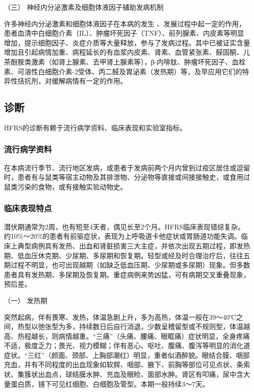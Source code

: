 \hypertarget{text00223.htmlux5cux23CHP7-7-1-2-3}{}
（三） 神经内分泌激素及细胞体液因子辅助发病机制

许多神经内分泌激素和细胞体液因子在本病的发生
、发展过程中起一定的作用，患者血清中白细胞介素（IL）、肿瘤坏死因子（TNF）、前列腺素、内皮素等明显增加，提示细胞因子、炎症介质等大量释放，参与了发病过程。其中已被证实含量增加且引起病情加重、病程延长的有血浆内皮素、肾素、血管紧张素、醛固酮、儿茶酚胺类激素（如肾上腺素、去甲肾上腺素等），β-内啡肽、肿瘤坏死因子、血栓素、可溶性白细胞介素-2受体、丙二醛及胃泌素（发热期）等，及早应用它们的特异性拮抗剂，对缓解病情有一定的作用。

\subsection{诊断}

HFRS的诊断有赖于流行病学资料、临床表现和实验室指标。

\subsubsection{流行病学资料}

在本病流行季节、流行地区发病，或患者于发病前两个月内曾到过疫区居住或逗留时，患者有与鼠类等宿主动物及其排泄物、分泌物等直接或间接接触史，或食用过鼠类污染的食物，或有接触实验动物史。

\subsubsection{临床表现特点}

潜伏期通常为2周，也有短至4天者，偶见长至2个月。HFRS临床表现错综复杂。约10\%～20\%的患者有前驱症状，表现为上呼吸道卡他症状或胃肠道功能失调。临床上典型病例具有发热、出血和肾脏损害三大主症，并依次出现五期过程，即发热期、低血压休克期、少尿期、多尿期和恢复期。轻型或经及时合理治疗后，往往五期过程不明显，也可出现越期（如缺乏低血压期、少尿期或多尿期）现象。但多数患者具有发热期、多尿期及恢复期。重症病例来势凶猛，可有病期交叉重叠现象，预后差。

\hypertarget{text00223.htmlux5cux23CHP7-7-2-2-1}{}
（一） 发热期

突然起病，伴有畏寒、发热，体温急剧上升，多为高热，体温一般在39～40℃之间，热型以弛张型为多，持续数日后自行消退，少数呈稽留型或不规则型，体温越高、热程越长，则病情越重。“三痛”（头痛、腰痛、眼眶痛）症状明显，全身疼痛不适，极度乏力；畏光、视力模糊；伴有恶心、呕吐、腹痛、腹泻等明显的消化道症状。“三红”（颜面、颈部、上胸部潮红）明显，重者似酒醉貌。眼结合膜、咽部充血，并有不同程度的出血现象如软腭、咽部、腋下、前胸等部位可见点状、条索状、集簇状出血点，球结膜水肿、充血及眼睑、面部水肿。肾区有叩痛，尿中含大量蛋白质，镜下可见红细胞、白细胞及管型。本期一般持续3～7天。

